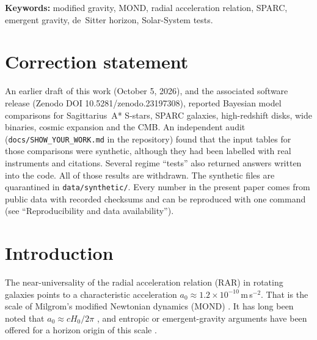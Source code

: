 \documentclass[11pt,a4paper]{article}
\begin{document}
\begin{abstract}
The specific law used in earlier EMRF drafts, $g = \sqrt{g_N^2 + a_0 g_N}$, is disfavoured: it fits worse than the RAR ($\Delta\mathrm{BIC} = +6{,}440$) and adds a constant $a_0/2$ in the Solar System, exceeding ephemeris bounds by orders of magnitude. With distances and inclinations held fixed, baryons plus a dark halo are preferred by BIC over every single-$a_0$ law. We discuss this caveat and state plainly which parts of EMRF are postulates, which are derived, and which remain open. This revision withdraws the empirical results of the earlier draft and Zenodo release, which were computed from synthetic data files.
\end{abstract}

\noindent\textbf{Keywords:} modified gravity, MOND, radial acceleration relation, SPARC, emergent gravity, de~Sitter horizon, Solar-System tests.

\section*{Correction statement}
An earlier draft of this work (October 5, 2026), and the associated software release (Zenodo DOI 10.5281/zenodo.23197308), reported Bayesian model comparisons for Sagittarius~A* S-stars, SPARC galaxies, high-redshift disks, wide binaries, cosmic expansion and the CMB. An independent audit (\texttt{docs/SHOW\_YOUR\_WORK.md} in the repository) found that the input tables for those comparisons were synthetic, although they had been labelled with real instruments and citations. Several regime ``tests'' also returned answers written into the code. All of those results are withdrawn. The synthetic files are quarantined in \texttt{data/synthetic/}. Every number in the present paper comes from public data with recorded checksums and can be reproduced with one command (see ``Reproducibility and data availability'').

\section{Introduction}
The near-universality of the radial acceleration relation (RAR) in rotating galaxies \cite{mcgaugh2016rar,lelli2016sparc,li2018} points to a characteristic acceleration $a_0 \approx 1.2\times10^{-10}$\,m\,s$^{-2}$. That is the scale of Milgrom's modified Newtonian dynamics (MOND) \cite{milgrom1983,famaey2012}. It has long been noted that $a_0 \approx cH_0/2\pi$ \cite{milgrom1999}, and entropic or emergent-gravity arguments have been offered for a horizon origin of this scale \cite{verlinde2011,verlinde2017,jacobson1995}.
\end{document}
